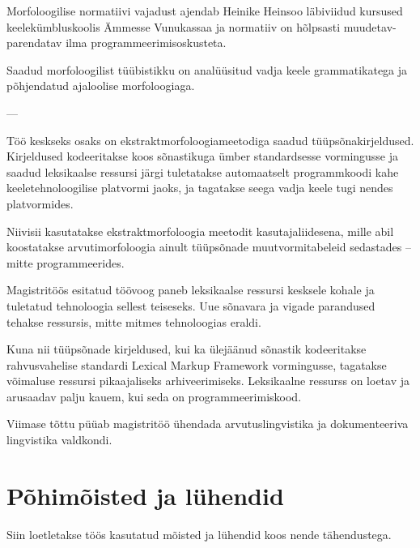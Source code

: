 \documentclass[12pt,a4paper]{article}
\begin{document}
Morfoloogilise normatiivi vajadust ajendab Heinike Heinsoo läbiviidud kursused keelekümbluskoolis Ämmesse Vunukassaa ja normatiiv on hõlpsasti muudetav-parendatav ilma programmeerimisoskusteta.

Saadud morfoloogilist tüübistikku on analüüsitud vadja keele grammatikatega ja põhjendatud ajaloolise morfoloogiaga.

---

Töö keskseks osaks on ekstraktmorfoloogiameetodiga saadud tüüpsõnakirjeldused.
Kirjeldused kodeeritakse koos sõnastikuga ümber standardsesse vormingusse ja saadud leksikaalse ressursi järgi tuletatakse automaatselt programmkoodi kahe keeletehnoloogilise platvormi jaoks, ja tagatakse seega vadja keele tugi nendes platvormides.

Niivisii kasutatakse ekstraktmorfoloogia meetodit kasutaja\-liidesena, mille abil koostatakse arvutimorfoloogia ainult tüüpsõnade muutvormitabeleid sedastades -- mitte programmeerides.

Magistritöös esitatud töövoog paneb leksikaalse ressursi kesksele kohale ja tuletatud tehnoloogia sellest teiseseks. Uue sõnavara ja vigade parandused tehakse ressursis, mitte mitmes tehnoloogias eraldi.

Kuna nii tüüpsõnade kirjeldused, kui ka ülejäänud sõnastik kodeeritakse rahvusvahelise standardi Lexical Markup Framework vormingusse, tagatakse võimaluse ressursi pikaajaliseks arhiveerimiseks. Leksikaalne ressurss on loetav ja arusaadav palju kauem, kui seda on programmeerimiskood.

Viimase tõttu püüab magistritöö ühendada arvutuslingvistika ja dokumenteeriva lingvistika valdkondi.







\newpage
\section{Põhimõisted ja lühendid}
\label{sec:põhimõisted}
Siin loetletakse töös kasutatud mõisted ja lühendid koos nende tähendustega.

\glsaddall
\small{
  \printglossary[title={},toctitle={}]
}
\end{document}
